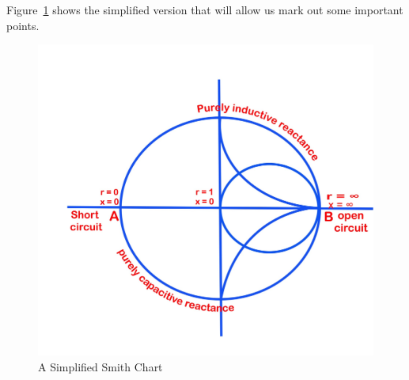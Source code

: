 Figure~\ref{fig:473-drawingjhgfd} shows the simplified version that will allow us mark out some important points.
\begin{figure}[h]
\centering
\includegraphics[width=0.7\linewidth]{"./graphics/473 drawingjhgfd"}
\caption{A Simplified Smith Chart}
\label{fig:473-drawingjhgfd}
\end{figure}

